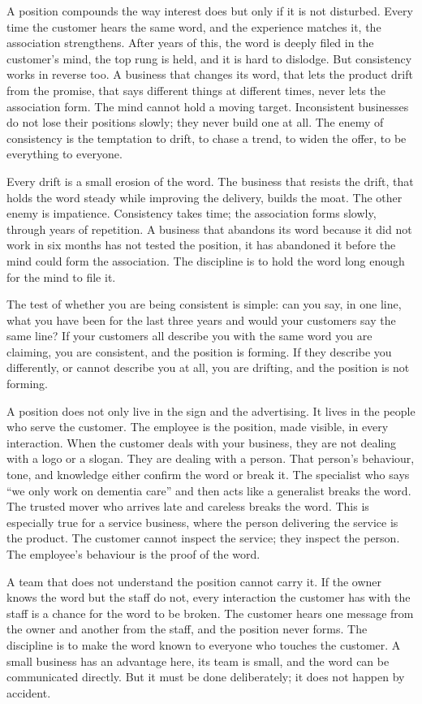 \documentclass[10pt,twoside,openany]{memoir}
\begin{document}
{A position compounds the way interest does but only if it is not
disturbed. Every time the customer hears the same word, and the
experience matches it, the association strengthens. After years of this,
the word is deeply filed in the customer's mind, the top rung is held,
and it is hard to dislodge. But consistency works in reverse too. A
business that changes its word, that lets the product drift from the
promise, that says different things at different times, never lets the
association form. The mind cannot hold a moving target. Inconsistent
businesses do not lose their positions slowly; they never build one at
all. The enemy of consistency is the temptation to drift, to chase a
trend, to widen the offer, to be everything to everyone.

Every drift is a small erosion of the word. The business that resists
the drift, that holds the word steady while improving the delivery,
builds the moat. The other enemy is impatience. Consistency takes time;
the association forms slowly, through years of repetition. A business
that abandons its word because it did not work in six months has not
tested the position, it has abandoned it before the mind could form the
association. The discipline is to hold the word long enough for the mind
to file it.

The test of whether you are being consistent is simple: can you say, in
one line, what you have been for the last three years and would your
customers say the same line? If your customers all describe you with the
same word you are claiming, you are consistent, and the position is
forming. If they describe you differently, or cannot describe you at
all, you are drifting, and the position is not forming.

A position does not only live in the sign and the advertising. It lives
in the people who serve the customer. The employee is the position, made
visible, in every interaction. When the customer deals with your
business, they are not dealing with a logo or a slogan. They are dealing
with a person. That person's behaviour, tone, and knowledge either
confirm the word or break it. The specialist who says ``we only work on
dementia care'' and then acts like a generalist breaks the word. The
trusted mover who arrives late and careless breaks the word. This is
especially true for a service business, where the person delivering the
service is the product. The customer cannot inspect the service; they
inspect the person. The employee's behaviour is the proof of the word.

A team that does not understand the position cannot carry it. If the
owner knows the word but the staff do not, every interaction the
customer has with the staff is a chance for the word to be broken. The
customer hears one message from the owner and another from the staff,
and the position never forms. The discipline is to make the word known
to everyone who touches the customer. A small business has an advantage
here, its team is small, and the word can be communicated directly. But
it must be done deliberately; it does not happen by accident.

}
\end{document}
